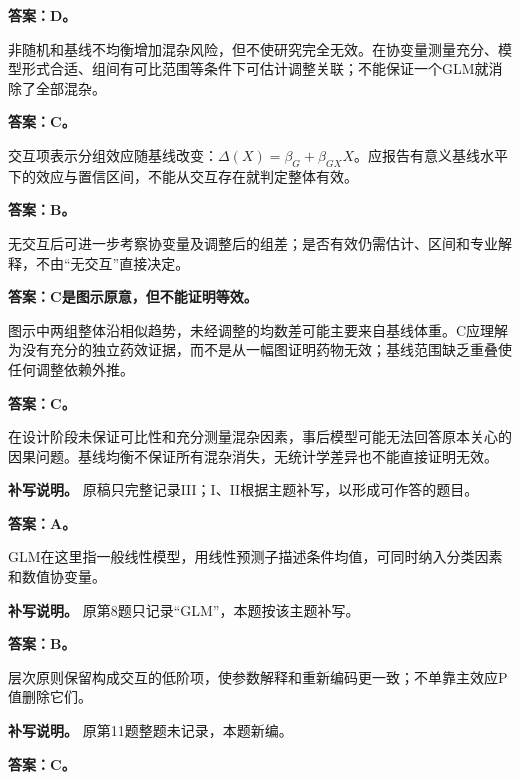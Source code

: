 
\textbf{答案：D。}

非随机和基线不均衡增加混杂风险，但不使研究完全无效。在协变量测量充分、模型形式合适、组间有可比范围等条件下可估计调整关联；不能保证一个GLM就消除了全部混杂。



\textbf{答案：C。}

交互项表示分组效应随基线改变：\(\Delta(X)=\beta_G+\beta_{GX}X\)。应报告有意义基线水平下的效应与置信区间，不能从交互存在就判定整体有效。



\textbf{答案：B。}

无交互后可进一步考察协变量及调整后的组差；是否有效仍需估计、区间和专业解释，不由``无交互''直接决定。



\textbf{答案：C是图示原意，但不能证明等效。}

图示中两组整体沿相似趋势，未经调整的均数差可能主要来自基线体重。C应理解为没有充分的独立药效证据，而不是从一幅图证明药物无效；基线范围缺乏重叠使任何调整依赖外推。



\textbf{答案：C。}

在设计阶段未保证可比性和充分测量混杂因素，事后模型可能无法回答原本关心的因果问题。基线均衡不保证所有混杂消失，无统计学差异也不能直接证明无效。


\textbf{补写说明。} 原稿只完整记录III；I、II根据主题补写，以形成可作答的题目。



\textbf{答案：A。}

GLM在这里指一般线性模型，用线性预测子描述条件均值，可同时纳入分类因素和数值协变量。


\textbf{补写说明。} 原第8题只记录``GLM''，本题按该主题补写。



\textbf{答案：B。}

层次原则保留构成交互的低阶项，使参数解释和重新编码更一致；不单靠主效应P值删除它们。


\textbf{补写说明。} 原第11题整题未记录，本题新编。



\textbf{答案：C。}

